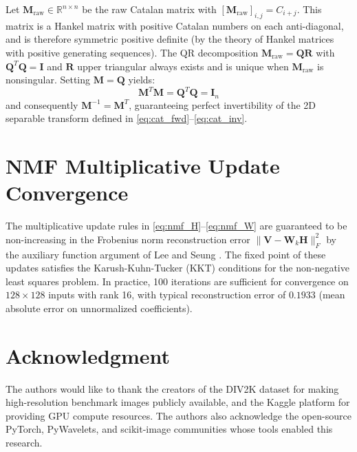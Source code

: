\documentclass[journal]{IEEEtran}
\begin{document}
Let $\mathbf{M}_{\text{raw}} \in \mathbb{R}^{n \times n}$ be the raw
Catalan matrix with $[\mathbf{M}_{\text{raw}}]_{i,j} = C_{i+j}$.
This matrix is a Hankel matrix with positive Catalan numbers on each
anti-diagonal, and is therefore symmetric positive definite (by the
theory of Hankel matrices with positive generating sequences). The
QR decomposition $\mathbf{M}_{\text{raw}} = \mathbf{QR}$ with
$\mathbf{Q}^T\mathbf{Q} = \mathbf{I}$ and $\mathbf{R}$ upper triangular
always exists and is unique when $\mathbf{M}_{\text{raw}}$ is nonsingular.
Setting $\mathbf{M} = \mathbf{Q}$ yields:
\begin{equation}
  \mathbf{M}^T\mathbf{M} = \mathbf{Q}^T\mathbf{Q} = \mathbf{I}_n
  \label{eq:orthogonal}
\end{equation}
and consequently $\mathbf{M}^{-1} = \mathbf{M}^T$, guaranteeing perfect
invertibility of the 2D separable transform defined in
\eqref{eq:cat_fwd}--\eqref{eq:cat_inv}.

\section{NMF Multiplicative Update Convergence}
\label{app:nmf_convergence}

The multiplicative update rules in \eqref{eq:nmf_H}--\eqref{eq:nmf_W}
are guaranteed to be non-increasing in the Frobenius norm reconstruction
error $\|\mathbf{V} - \mathbf{W}_k\mathbf{H}\|_F^2$ by the auxiliary
function argument of Lee and Seung \cite{lee2001algorithms}.
The fixed point of these updates satisfies the Karush-Kuhn-Tucker (KKT)
conditions for the non-negative least squares problem. In practice,
100 iterations are sufficient for convergence on $128 \times 128$ inputs
with rank 16, with typical reconstruction error of $0.1933$ (mean
absolute error on unnormalized coefficients).

\section*{Acknowledgment}

The authors would like to thank the creators of the DIV2K dataset for
making high-resolution benchmark images publicly available, and the
Kaggle platform for providing GPU compute resources. The authors also
acknowledge the open-source PyTorch, PyWavelets, and scikit-image
communities whose tools enabled this research.
\end{document}
